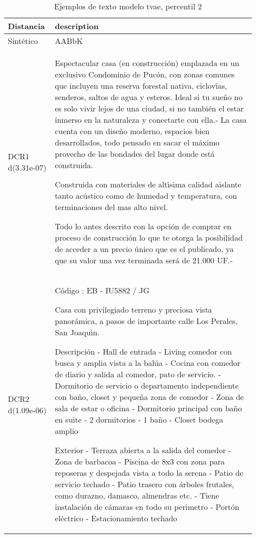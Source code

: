 \begin{table}[H]
\centering
\fontsize{10}{14}\selectfont
\caption{Ejemplos de texto modelo tvae, percentil 2}
\label{table-example-economicos-a-3-tvae-2p-text}
\begin{tabular}{|l|m{35em}|}
\hline
\rowcolor[gray]{0.8}
Distancia & description \\
\hline Sintético & AABbK \\
\hline DCR1 d(3.31e-07) & Espectacular casa (en construcci\'on) emplazada  en un exclusivo Condominio de Puc\'on, con zonas comunes que incluyen una reserva forestal nativa, ciclov{\'\i}as, senderos, saltos de agua y esteros. Ideal si tu sue\~no no es solo vivir lejos de una ciudad, si no tambi\'en el estar inmerso en la naturaleza y conectarte con ella.- 
La casa cuenta con un dise\~no moderno, espacios bien desarrollados, todo pensado en sacar el m\'aximo provecho de las bondades del lugar donde est\'a construida. 

Construida con materiales de alt{\'\i}sima calidad aislante tanto ac\'ustico como de humedad y temperatura, con terminaciones del mas alto nivel. 

Todo lo antes descrito con la opci\'on de comprar en proceso de construcci\'on lo que te otorga la posibilidad de acceder a un precio \'unico que es el publicado, ya que su valor una vez terminada ser\'a de 21.000 UF.- \\
\hline DCR2 d(1.09e-06) & C\'odigo : EB - IU5882 / JG

Casa con privilegiado terreno y preciosa vista panor\'amica, a pasos de importante calle Los Perales, San Joaqu{\'\i}n.

Descripci\'on
- Hall de entrada
- Living comedor  con busca y  amplia vista a la bah{\'\i}a
- Cocina con comedor de diario y salida al comedor, pato de servicio.
- Dormitorio de servicio o departamento independiente con ba\~no, closet y peque\~na zona de comedor
- Zona de sala de estar o oficina
- Dormitorio principal con ba\~no en suite
- 2 dormitorios
- 1 ba\~no
- Closet bodega amplio

Exterior
- Terraza abierta a la salida del comedor
- Zona de barbacoa
- Piscina de 8x3 con zona para reposeras y despejada vista a todo la serena
- Patio de servicio techado
- Patio trasero con \'arboles frutales, como durazno, damasco, almendras etc.
- Tiene instalaci\'on de c\'amaras en todo su per{\'\i}metro
- Port\'on el\'ectrico 
- Estacionamiento techado \\
\hline
\end{tabular}
\end{table}
